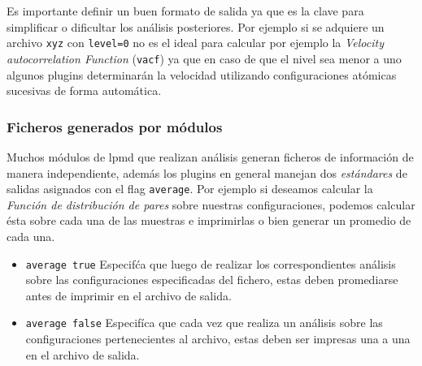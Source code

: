 Es importante definir un buen formato de salida ya que es la clave para simplificar o dificultar los an\'alisis posteriores. Por ejemplo si se adquiere un archivo \verb|xyz| con \verb|level=0| no es el ideal para calcular por ejemplo la \textit{Velocity autocorrelation Function} (\verb|vacf|) ya que en caso de que el nivel sea menor a uno algunos plugins determinar\'an la velocidad utilizando configuraciones at\'omicas sucesivas de forma autom\'atica.

\subsubsection{Ficheros generados por m\'odulos}
Muchos m\'odulos de lpmd que realizan an\'alisis generan ficheros de informaci\'on de manera independiente, además los plugins en general manejan dos \textit{est\'andares} de salidas asignados con el flag \verb|average|. Por ejemplo si deseamos calcular la \textit{Funci\'on de distribuci\'on de pares} sobre nuestras configuraciones, podemos calcular \'esta sobre cada una de las muestras e imprimirlas o bien generar un promedio de cada una.

\begin{itemize}
\item \verb|average true|
Especif\'ca que luego de realizar los correspondientes an\'alisis sobre las configuraciones especificadas del fichero, estas deben promediarse antes de imprimir en el archivo de salida.
\item \verb|average false|
Especif\'ica que cada vez que realiza un an\'alisis sobre las configuraciones pertenecientes al archivo, estas deben ser impresas una a una en el archivo de salida. 
\end{itemize}
